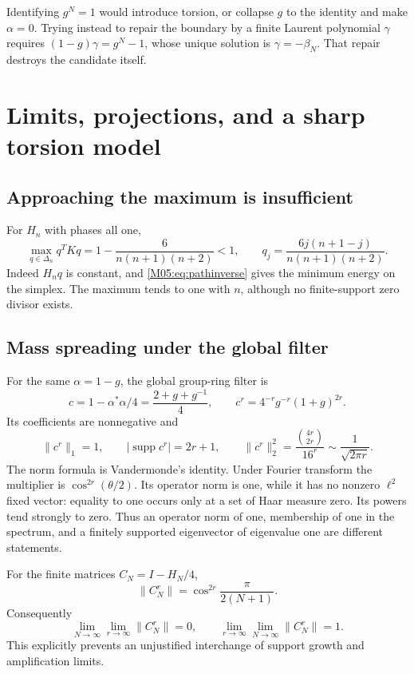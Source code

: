 \documentclass[11pt,a4paper,oneside]{report}
\theoremstyle{definition}
\theoremstyle{remark}
\DeclareMathOperator{\supp}{supp}
\newcommand{\DD}{\Delta}
\begin{document}
Identifying $g^N=1$ would introduce torsion, or collapse $g$ to
the identity and make $\alpha=0$. Trying instead to repair the
boundary by a finite Laurent polynomial $\gamma$ requires
$(1-g)\gamma=g^N-1$, whose unique solution is
$\gamma=-\beta_N$. That repair destroys the candidate itself.

\section{Limits, projections, and a sharp torsion model}
\label{M05:sec:limits}

\subsection{Approaching the maximum is insufficient}
For $H_n$ with phases all one,
\[
 \max_{q\in\DD_n}q^TKq
 =1-\frac6{n(n+1)(n+2)}<1,
 \qquad
 q_j=\frac{6j(n+1-j)}{n(n+1)(n+2)}.
\]
Indeed $H_nq$ is constant, and
\eqref{M05:eq:pathinverse} gives the minimum energy on the simplex.
The maximum tends to one with $n$, although no finite-support
zero divisor exists.

\subsection{Mass spreading under the global filter}
For the same $\alpha=1-g$, the global group-ring filter is
\[
 c=1-\alpha^*\alpha/4=\frac{2+g+g^{-1}}4,\qquad
 c^r=4^{-r}g^{-r}(1+g)^{2r}.
\]
Its coefficients are nonnegative and
\begin{equation}\label{M05:eq:binomial}
 \|c^r\|_1=1,\qquad |\supp c^r|=2r+1,\qquad
 \|c^r\|_2^2=\frac{\binom{4r}{2r}}{16^r}
 \sim\frac1{\sqrt{2\pi r}} .
\end{equation}
The norm formula is Vandermonde's identity. Under Fourier
transform the multiplier is $\cos^{2r}(\theta/2)$.
Its operator norm is one, while it has no nonzero $\ell^2$
fixed vector: equality to one occurs only at a set of Haar
measure zero. Its powers tend strongly to zero.
Thus an operator norm of one, membership of one in the spectrum,
and a finitely supported eigenvector of eigenvalue one are
different statements.

For the finite matrices $C_N=I-H_N/4$,
\[
 \|C_N^r\|=\cos^{2r}\frac{\pi}{2(N+1)}.
\]
Consequently
\[
 \lim_{N\to\infty}\lim_{r\to\infty}\|C_N^r\|=0,
 \qquad
 \lim_{r\to\infty}\lim_{N\to\infty}\|C_N^r\|=1 .
\]
This explicitly prevents an unjustified interchange of support
growth and amplification limits.
\end{document}
